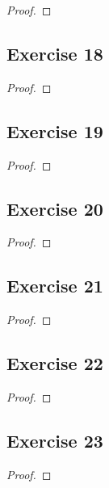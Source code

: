 \documentclass[14pt]{extarticle}
\begin{document}
\begin{proof}

\end{proof}

\subsection{Exercise 18}

\begin{proof}

\end{proof}

\subsection{Exercise 19}

\begin{proof}

\end{proof}

\subsection{Exercise 20}

\begin{proof}

\end{proof}

\subsection{Exercise 21}

\begin{proof}

\end{proof}

\subsection{Exercise 22}

\begin{proof}

\end{proof}

\subsection{Exercise 23}

\begin{proof}

\end{proof}
\end{document}
